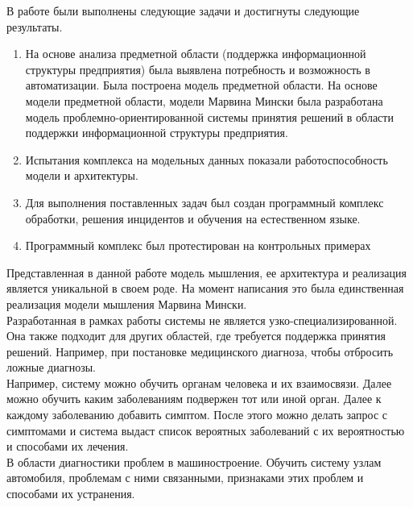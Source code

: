 
В работе были выполнены следующие задачи и достигнуты следующие результаты.
\begin{enumerate}
  \item На основе анализа предметной области (поддержка информационной структуры предприятия) была выявлена потребность и возможность в автоматизации. Была построена модель предметной области. На основе модели предметной области, модели Марвина Мински была разработана модель проблемно-ориентированной системы принятия решений в области поддержки информационной структуры предприятия.  
  \item Испытания комплекса на модельных данных показали работоспособность модели и архитектуры.  
  \item Для выполнения поставленных задач был создан программный комплекс обработки, решения инцидентов и обучения на естественном языке. 
  \item Программный комплекс был протестирован на контрольных примерах
\end{enumerate}

Представленная в данной работе модель мышления, ее архитектура и реализация является уникальной в своем роде. На момент написания это была единственная реализация модели мышления Марвина Мински. \\
Разработанная в рамках работы системы не является узко-специализированной. Она также подходит для других областей, где требуется поддержка принятия решений. Например, при постановке медицинского диагноза, чтобы отбросить ложные диагнозы. \\
Например, систему можно обучить органам человека и их взаимосвязи. Далее можно обучить каким заболеваниям подвержен тот или иной орган. Далее к каждому заболеванию добавить симптом. После этого можно делать запрос с симптомами и система выдаст список вероятных заболеваний с их вероятностью и способами их лечения. \\
В области диагностики проблем в машиностроение. Обучить систему узлам автомобиля, проблемам с ними связанными, признаками этих проблем и способами их устранения. 



